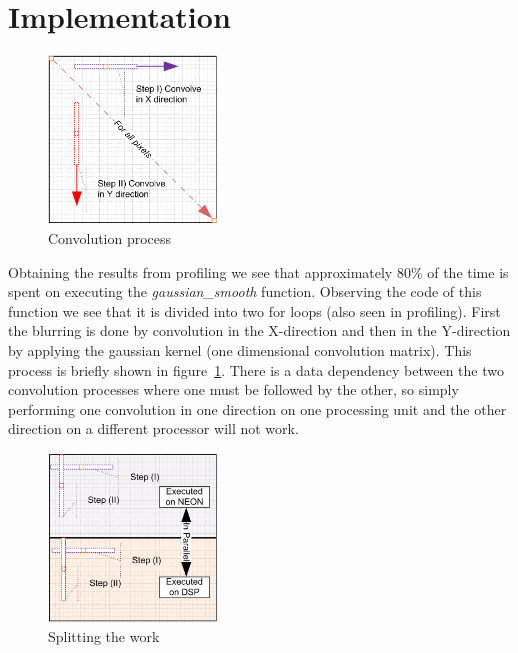 \section{Implementation}

\begin{figure}
\centering
\includegraphics[width=0.4\textwidth]{drawings/gaussian_general}
\caption{Convolution process}
\label{fig:convolution}
\end{figure}

Obtaining the results from profiling we see that approximately 80\% of the time is spent on executing the \textit{gaussian\_smooth} function. Observing the code of this function we see that it is divided into two for loops (also seen in profiling).
First the blurring is done by convolution in the X-direction and then in the Y-direction by applying the gaussian kernel (one dimensional convolution matrix). This process is briefly shown in figure~\ref{fig:convolution}. There is a data dependency between the two convolution processes where one must be followed by the other, so simply performing one convolution in one direction on one processing unit and the other direction on a different processor will not work.

\begin{figure}
\centering
\includegraphics[width=0.4\textwidth]{drawings/gaussian_balancing}
\caption{Splitting the work}
\label{fig:balancing}
\end{figure}

